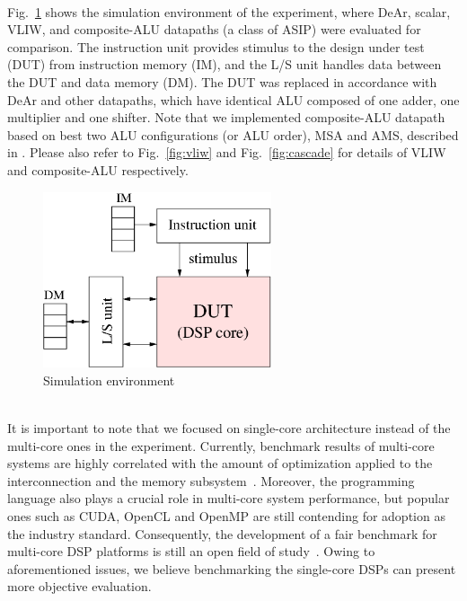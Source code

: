 \\\indent Fig.~\ref{fig:sim} shows the simulation environment of the experiment, 
where DeAr, scalar, VLIW, and composite-ALU datapaths (a class of ASIP) \cite{cascade} were evaluated for comparison. 
The instruction unit provides stimulus to the design under test (DUT) from instruction memory (IM),
and the L/S unit handles data between the DUT and data memory (DM).
The DUT was replaced in accordance with DeAr and other datapaths, 
which have identical ALU composed of one adder, one multiplier and one shifter.
Note that we implemented composite-ALU datapath based on best two ALU configurations (or ALU order), MSA and AMS, described in \cite{cascade}.
Please also refer to Fig.~\ref{fig:vliw} and Fig.~\ref{fig:cascade} for details of VLIW and composite-ALU respectively.
\vspace{\textfig}
\begin{figure}[!ht] 
    \centering
    \includegraphics[width=0.6\textwidth]{./figs/sim.eps}
    \caption{Simulation environment}
    \label{fig:sim}
\end{figure}
\\\indent 
It is important to note that we focused on single-core architecture instead of the multi-core ones in the experiment.
Currently, benchmark results of multi-core systems are highly correlated with the amount of optimization applied to the interconnection and the memory subsystem~\cite{trends}.
Moreover, the programming language also plays a crucial role in multi-core system performance, 
but popular ones such as CUDA, OpenCL and OpenMP are still contending for adoption as the industry standard.
Consequently, the development of a fair benchmark for multi-core DSP platforms is still an open field of study~\cite{landscape}.
Owing to aforementioned issues, we believe benchmarking the single-core DSPs can present more objective evaluation.
